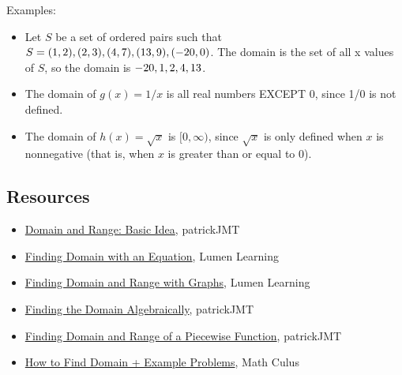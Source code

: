 Examples:



\begin{itemize}
    \item Let $S$ be a set of ordered pairs such that $S = \\{(1,2), (2,3), (4, 7), (13, 9), (-20, 0)\\}$. The domain is the set of all x values of $S$, so the domain is $\\{-20, 1, 2, 4, 13\\}$.
    \item The domain of $g(x) = 1/x$ is all real numbers EXCEPT 0, since 1/0 is not defined.
    \item The domain of $h(x) = \sqrt{x}$ is $[0, \infty)$, since $\sqrt{x}$ is only defined when $x$ is nonnegative (that is, when $x$ is greater than or equal to 0).
\end{itemize}


\subsection{Resources}
\label{sss:reso-55b5}




\begin{itemize}
    \item \href{https://www.youtube.com/watch?v=Q3NWljhiSJg}{Domain and Range: Basic Idea}, patrickJMT
    \item \href{https://courses.lumenlearning.com/ivytech-collegealgebra/chapter/find-the-domain-of-a-function-defined-by-an-equation/}{Finding Domain with an Equation}, Lumen Learning
    \item \href{https://courses.lumenlearning.com/ivytech-collegealgebra/chapter/find-domain-and-range-from-graphs/}{Finding Domain and Range with Graphs}, Lumen Learning
    \item \href{https://www.youtube.com/watch?v=w81y25anEOM}{Finding the Domain Algebraically}, patrickJMT
    \item \href{https://www.youtube.com/watch?v=BxaYyS6lsQ4}{Finding Domain and Range of a Piecewise Function}, patrickJMT
    \item \href{https://mathculus.com/how-to-find-the-domain-of-a-function-algebraically/}{How to Find Domain + Example Problems}, Math Culus
\end{itemize}


